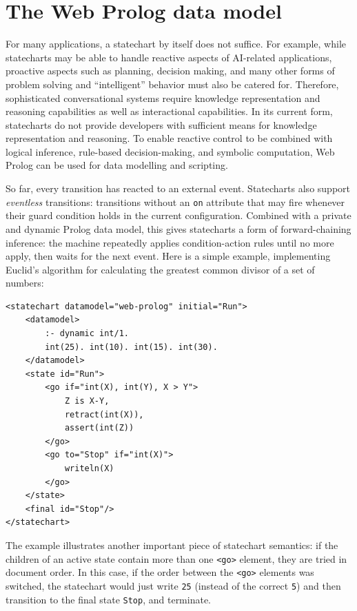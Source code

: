 \section{The Web Prolog data model}
\label{sec:web-prolog-data-model}

For many applications, a statechart by itself does not suffice. For example, while statecharts may be able to handle reactive aspects of AI-related applications, proactive aspects such as planning, decision making, and many other forms of problem solving and ``intelligent'' behavior must also be catered for. Therefore, sophisticated conversational systems require knowledge representation and reasoning capabilities as well as interactional capabilities. In its current form, statecharts do not provide developers with sufficient means for knowledge representation and reasoning. To enable reactive control to be combined with logical inference, rule-based decision-making, and symbolic computation, Web Prolog can be used for data modelling and scripting.

So far, every transition has reacted to an external event. Statecharts also support \textit{eventless} transitions: transitions without an \texttt{on} attribute that may fire whenever their guard condition holds in the current configuration.
Combined with a private and dynamic Prolog data model, this gives statecharts a form of forward-chaining inference: the machine repeatedly applies condition-action rules until no more apply, then waits for the next event. Here is a simple example, implementing Euclid's algorithm for calculating the greatest common divisor of a set of numbers:

\begin{verbatim}
<statechart datamodel="web-prolog" initial="Run">
    <datamodel>
        :- dynamic int/1.
        int(25). int(10). int(15). int(30).
    </datamodel>
    <state id="Run">
        <go if="int(X), int(Y), X > Y">
            Z is X-Y,
            retract(int(X)),
            assert(int(Z))
        </go>
        <go to="Stop" if="int(X)">
            writeln(X)
        </go>
    </state>
    <final id="Stop"/>
</statechart>
\end{verbatim}

\noindent The example illustrates another important piece of statechart semantics: if the children of an active state contain more than one \texttt{<go>} element, they are tried in document order. In this case, if the order between the \texttt{<go>} elements was switched, the statechart would just write \texttt{25} (instead of the correct \texttt{5}) and then transition to the final state \texttt{Stop}, and terminate.

